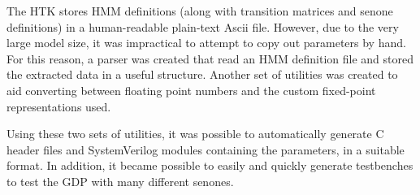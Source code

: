 	The HTK stores HMM definitions (along with transition matrices and senone definitions) in a human-readable plain-text Ascii file.  However, due to the very large model size, it was impractical to attempt to copy out parameters by hand.  For this reason, a parser was created that read an HMM definition file and stored the extracted data in a useful structure.  Another set of utilities was created to aid converting between floating point numbers and the custom fixed-point representations used.  

	Using these two sets of utilities, it was possible to automatically generate C header files and SystemVerilog modules containing the parameters, in a suitable format.  In addition, it became possible to easily and quickly generate testbenches to test the GDP with many different senones.


